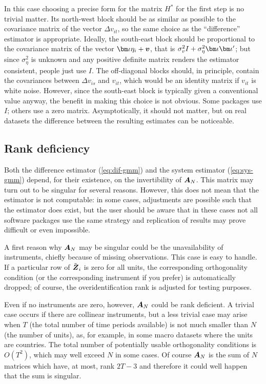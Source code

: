 In this case choosing a precise form for the matrix $H^*$ for the
first step is no trivial matter. Its north-west block should be as
similar as possible to the covariance matrix of the vector $\Delta
v_{it}$, so the same choice as the ``difference'' estimator is
appropriate. Ideally, the south-east block should be proportional to
the covariance matrix of the vector $\biota \eta_i + \bv$, that is
$\sigma^2_{v} I + \sigma^2_{\eta} \biota \biota'$; but since
$\sigma^2_{\eta}$ is unknown and any positive definite matrix renders
the estimator consistent, people just use $I$. The off-diagonal blocks
should, in principle, contain the covariances between $\Delta v_{is}$
and $v_{it}$, which would be an identity matrix if $v_{it}$ is white
noise. However, since the south-east block is typically given a
conventional value anyway, the benefit in making this choice is not
obvious. Some packages use $I$; others use a zero matrix.
Asymptotically, it should not matter, but on real datasets the
difference between the resulting estimates can be noticeable.

\subsection{Rank deficiency}
\label{sec:rankdef}

Both the difference estimator (\ref{eq:dif-gmm}) and the system
estimator (\ref{eq:sys-gmm}) depend, for their existence, on the
invertibility of $\boldsymbol{A}_N$. This matrix may turn out to be singular for
several reasons. However, this does not mean that the estimator is not
computable: in some cases, adjustments are possible such that the
estimator does exist, but the user should be aware that in these cases
not all software packages use the same strategy and replication of
results may prove difficult or even impossible.

A first reason why $\boldsymbol{A}_N$ may be singular could be the unavailability
of instruments, chiefly because of missing observations. This case is
easy to handle. If a particular row of $\tilde{\boldsymbol{Z}}_i$ is zero for all
units, the corresponding orthogonality condition (or the corresponding
instrument if you prefer) is automatically dropped; of course, the
overidentification rank is adjusted for testing purposes.

Even if no instruments are zero, however, $\boldsymbol{A}_N$ could be rank
deficient. A trivial case occurs if there are collinear instruments,
but a less trivial case may arise when $T$ (the total number of time
periods available) is not much smaller than $N$ (the number of units),
as, for example, in some macro datasets where the units are
countries. The total number of potentially usable orthogonality
conditions is $O(T^2)$, which may well exceed $N$ in some cases. Of
course $\boldsymbol{A}_N$ is the sum of $N$ matrices which have, at most, rank $2T -
3$ and therefore it could well happen that the sum is singular.

